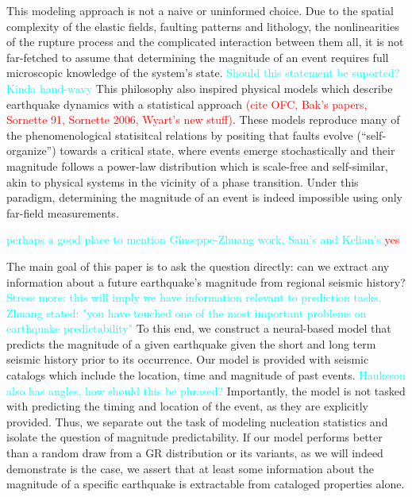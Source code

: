 \documentclass[pdflatex]{sn-jnl}
\newcommand{\yohai}[1]{{\textcolor{red}{#1}}}
\newcommand{\neri}[1]{{\textcolor{cyan}{#1}}}
\begin{document}
This modeling approach is not a naive or uninformed choice. Due to the spatial complexity of the elastic fields, faulting patterns and lithology, the nonlinearities of the rupture process and the complicated interaction between them all, it is not far-fetched to assume that determining the magnitude of an event  requires full microscopic knowledge of the system's state.  \neri{Should this statement be suported? Kinda hand-wavy}
This philosophy also inspired physical models which describe earthquake dynamics with a statistical approach \yohai{(cite OFC, Bak's papers, Sornette 91, Sornette 2006, Wyart's new stuff)}. These models reproduce many of the phenomenological  statisitcal relations by positing that faults evolve (``self-organize'') towards a critical state, where events emerge stochastically and their magnitude follows a power-law distribution which is scale-free and self-similar, akin to physical systems in the vicinity of a phase transition. Under this paradigm, determining the magnitude of an event is indeed impossible using only far-field measurements. 

\neri{perhaps a good place to mention Giuseppe-Zhuang work, Sam's  and Kelian's} \yohai{yes}

The main goal of this paper is to ask the question directly: can we extract any information about a future earthquake's magnitude from regional seismic history? \neri{Stress more: this will imply we have information relevant to prediction tasks. Zhuang stated: "you have touched one of the most important problems on earthquake predictability"} To this end, we construct a neural-based model that predicts the magnitude of a given earthquake given the short and long term seismic history prior to its occurrence. Our model is provided with seismic catalogs which include the location, time and magnitude of past events. \neri{Hauksson also has angles, how should this be phrased?} Importantly, the model is not tasked with predicting the timing and location of the event, as they are explicitly provided. Thus, we separate out the task of modeling nucleation statistics and isolate the question of magnitude predictability. If our model performs better than a random draw from a GR distribution or its variants, as we will indeed demonstrate is the case, we assert that at least some information about the magnitude of a specific earthquake is extractable from cataloged properties alone. 
\end{document}
